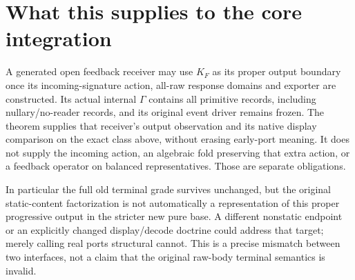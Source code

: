 \documentclass[11pt]{article}
\begin{document}
\section{What this supplies to the core integration}
A generated open feedback receiver may use $K_F$ as its proper output boundary once its incoming-signature action, all-raw response domains and exporter are constructed. Its actual internal $\Gamma$ contains all primitive records, including nullary/no-reader records, and its original event driver remains frozen. The theorem supplies that receiver's output observation and its native display comparison on the exact class above, without erasing early-port meaning. It does not supply the incoming action, an algebraic fold preserving that extra action, or a feedback operator on balanced representatives. Those are separate obligations.

In particular the full old terminal grade survives unchanged, but the original static-content factorization is not automatically a representation of this proper progressive output in the stricter new pure base. A different nonstatic endpoint or an explicitly changed display/decode doctrine could address that target; merely calling real ports structural cannot. This is a precise mismatch between two interfaces, not a claim that the original raw-body terminal semantics is invalid.
\end{document}
